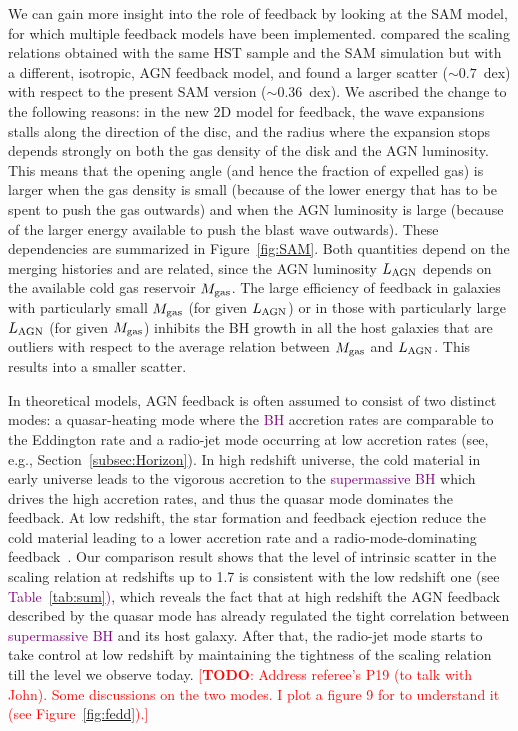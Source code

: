 \documentclass[twocolumn]{aastex631}
\newcommand{\todo}[1]{\textcolor{red}{[{\bf TODO}: #1]}}
\newcommand{\red}[1]{\textcolor{purple}{#1}}
\begin{document}
We can gain more insight into the role of feedback by looking at the SAM model, for which multiple feedback models have been implemented. \citet{Ding2020b} compared the scaling relations obtained with the same HST sample and the SAM simulation but with a different, isotropic, AGN feedback model, and found a larger scatter ($\sim0.7$~dex) with respect to the present SAM version ($\sim0.36$~dex). We ascribed the change to the following reasons: in the new 2D model for feedback, the wave expansions stalls along the direction of the disc, and the radius where the expansion stops depends strongly on both the gas density of the disk and the AGN luminosity. 
This means that the opening angle (and hence the fraction of expelled gas) is larger when the gas density is small (because of the lower energy that has to be spent to push the gas outwards) and when the AGN luminosity is large (because of the larger energy available to push the blast wave outwards). These dependencies are summarized in Figure~\ref{fig:SAM}. 
Both quantities depend on the merging histories and are  related, since the AGN luminosity $L_{\rm AGN}$ depends on the available cold gas reservoir $M_{\rm gas}$.
The large efficiency of feedback in galaxies with particularly small $M_{\rm gas}$ (for given $L_{\rm AGN}$) or in those with particularly large $L_{\rm AGN}$
(for given $M_{\rm gas}$) inhibits the BH growth in all the host galaxies that are outliers with respect to the average relation between $M_{\rm gas}$ and $L_{\rm AGN}$. 
This results into a smaller scatter.

In theoretical models, AGN feedback is often assumed to consist of two distinct modes:
a quasar-heating mode where the \red{BH} accretion rates are comparable to the Eddington rate and a radio-jet mode occurring at low accretion rates (see, e.g., Section~\ref{subsec:Horizon}). In high redshift universe, the cold material in early universe leads to the vigorous accretion to the \red{supermassive BH} which drives the high accretion rates, and thus the quasar mode dominates the feedback. At low redshift, the star formation and feedback ejection reduce the cold material leading to a lower accretion rate and a radio-mode-dominating feedback~\citep[e.g.][]{2012MNRAS.420.2662D,2016MNRAS.460.2979V,2018MNRAS.479.4056W}. Our comparison result shows that the level of intrinsic scatter in the scaling relation at redshifts up to 1.7 is consistent with the low redshift one (see \red{Table~\ref{tab:sum})}, which reveals the fact that at high redshift the AGN feedback described by the quasar mode has already regulated the tight correlation between \red{supermassive BH} and its host galaxy. After that, the radio-jet mode starts to take control at low redshift by maintaining the tightness of the scaling relation till the level we observe today. \todo{Address referee's P19 (to talk with John). Some discussions on the two modes. I plot a figure 9 for to understand it (see Figure~\ref{fig:fedd}).}
\end{document}
